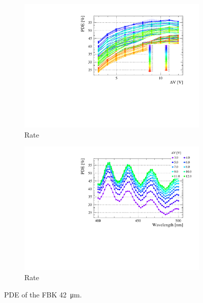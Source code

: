 \begin{landscape}
\begin{figure}[htbp]
\begin{subfigure}{0.65\textwidth}
        \includegraphics[width=\linewidth]{gfx/plots/PDE/42/c_Freq_Bias.pdf}    
        \caption{Rate}
    \end{subfigure}
    \begin{subfigure}{0.65\textwidth}
        \includegraphics[width=\linewidth]{gfx/plots/PDE/42/c_Freq_Wavelength.pdf} 
        \caption{Rate}
    \end{subfigure}
    \caption{PDE of the FBK \SI{42}{\micro m}. }
    \label{fig:pde 42um}
\end{figure}
\end{landscape}

